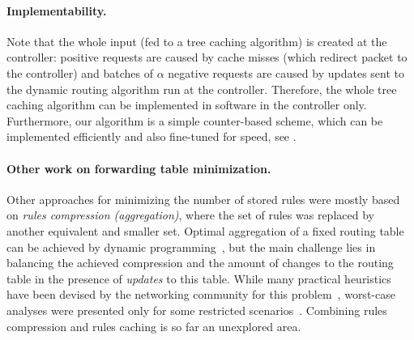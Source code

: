 \paragraph{Implementability.}

Note that the whole input (fed to a tree caching algorithm) is created at the
controller: positive requests are caused by cache misses (which redirect
packet to the controller) and batches of $\alpha$ negative requests are caused
by updates sent to the dynamic routing algorithm run at the controller.
Therefore, the whole tree caching algorithm can be implemented in software
in the controller only. Furthermore, our algorithm is a simple counter-based
scheme, which can be implemented efficiently and also fine-tuned for speed,
see .

\paragraph{Other work on forwarding table minimization.}

Other approaches for minimizing the number of stored rules were mostly based
on \emph{rules compression (aggregation)}, where the set of rules was replaced
by another equivalent and smaller set. Optimal aggregation of a fixed routing
table can be achieved by dynamic
programming~\cite{ortc,fib-compression-two-dimensional}, but the main
challenge lies in balancing the achieved compression and the amount of changes
to the routing table in the presence of \emph{updates} to this table. While
many practical heuristics have been devised by the networking community for
this problem~\cite{mms,fib-compression-fifa,fib-compression-globecom10,fib-compression-infocom13,fib-sigcomm,fib-compression-smalta,fib-compression-infocom10},
worst-case analyses were presented only for some restricted
scenarios~\cite{fib-icdcs,fib-sirocco}. Combining rules compression and rules
caching is so far an unexplored area.

